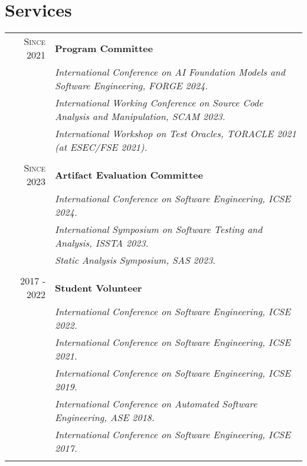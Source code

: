 \documentclass[a4paper,10pt]{article} %
\begin{document}
\section{Services}
\begin{longtable}{rl}

\textsc{Since 2021}   & \textbf{Program Committee} \\
& \textit{International Conference on AI Foundation Models and Software Engineering, FORGE 2024.} \\
& \textit{International Working Conference on Source Code Analysis and Manipulation, SCAM 2023.} \\ 
& \textit{International Workshop on Test Oracles, TORACLE 2021 (at ESEC/FSE 2021).} \\ & \\

\textsc{Since 2023} & \textbf{Artifact Evaluation Committee} \\
& \textit{International Conference on Software Engineering, ICSE 2024.} \\
& \textit{International Symposium on Software Testing and Analysis, ISSTA 2023.} \\ 
& \textit{Static Analysis Symposium, SAS 2023.} \\ & \\

\textsc{2017 - 2022} & \textbf{Student Volunteer} \\
& \textit{International Conference on Software Engineering, ICSE 2022.} \\
& \textit{International Conference on Software Engineering, ICSE 2021.} \\
& \textit{International Conference on Software Engineering, ICSE 2019.} \\
& \textit{International Conference on Automated Software Engineering, ASE 2018.} \\
& \textit{International Conference on Software Engineering, ICSE 2017.} \\ & \\

\end{longtable}
\end{document}
